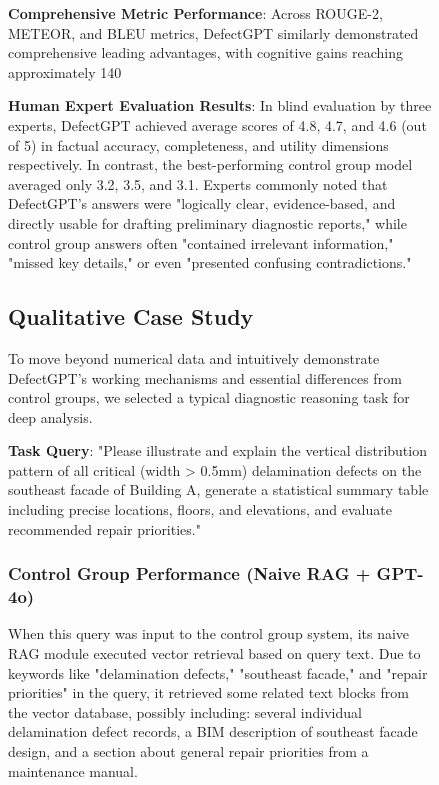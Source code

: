 \begin{figure}[htbp]
\textbf{Comprehensive Metric Performance}: Across ROUGE-2, METEOR, and BLEU metrics, DefectGPT similarly demonstrated comprehensive leading advantages, with cognitive gains reaching approximately 140%

\textbf{Human Expert Evaluation Results}: In blind evaluation by three experts, DefectGPT achieved average scores of 4.8, 4.7, and 4.6 (out of 5) in factual accuracy, completeness, and utility dimensions respectively. In contrast, the best-performing control group model averaged only 3.2, 3.5, and 3.1. Experts commonly noted that DefectGPT's answers were "logically clear, evidence-based, and directly usable for drafting preliminary diagnostic reports," while control group answers often "contained irrelevant information," "missed key details," or even "presented confusing contradictions."

\subsection{Qualitative Case Study}

To move beyond numerical data and intuitively demonstrate DefectGPT's working mechanisms and essential differences from control groups, we selected a typical diagnostic reasoning task for deep analysis.

\textbf{Task Query}: "Please illustrate and explain the vertical distribution pattern of all critical (width > 0.5mm) delamination defects on the southeast facade of Building A, generate a statistical summary table including precise locations, floors, and elevations, and evaluate recommended repair priorities."

\subsubsection{Control Group Performance (Naive RAG + GPT-4o)}

When this query was input to the control group system, its naive RAG module executed vector retrieval based on query text. Due to keywords like "delamination defects," "southeast facade," and "repair priorities" in the query, it retrieved some related text blocks from the vector database, possibly including: several individual delamination defect records, a BIM description of southeast facade design, and a section about general repair priorities from a maintenance manual.


\end{figure}

